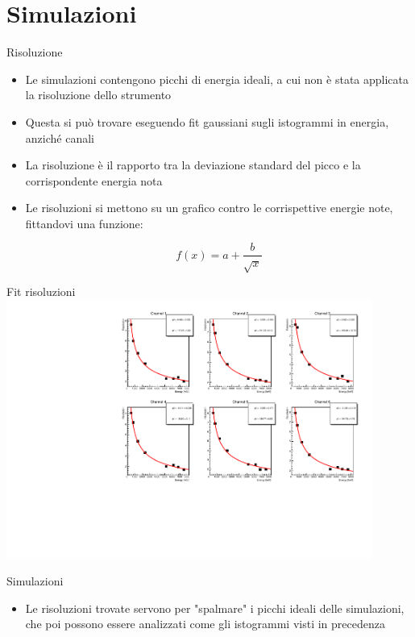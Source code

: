 \documentclass [xcolor=svgnames] {beamer}
\begin{document}
\section{Simulazioni}
\begin{frame}{Risoluzione}
	\begin{itemize}
		\item Le simulazioni contengono picchi di energia ideali, a cui non è stata applicata la risoluzione dello strumento
		\item Questa si può trovare eseguendo fit gaussiani sugli istogrammi in energia, anziché canali
		\item La risoluzione è il rapporto tra la deviazione standard del picco e la corrispondente energia nota
		\item Le risoluzioni si mettono su un grafico contro le corrispettive energie note, fittandovi una funzione:
		
		\begin{equation*}
			f(x) = a + \dfrac{b}{\sqrt{x}}
		\end{equation*}
	\end{itemize}
\end{frame}
\begin{frame}{Fit risoluzioni}
	\centering
	\includegraphics[width=0.9\textwidth]{img/ResolutionGraphs.pdf}
\end{frame}
\begin{frame}{Simulazioni}
	\begin{itemize}
		\item Le risoluzioni trovate servono per "spalmare" i picchi ideali delle simulazioni, che poi possono essere analizzati come gli istogrammi visti in precedenza
	\end{itemize}
\end{frame}
	
\end{document}
